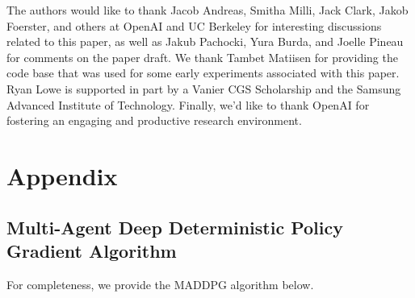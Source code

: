 \documentclass{article}
\begin{document}
The authors would like to thank Jacob Andreas, Smitha Milli, Jack Clark, Jakob Foerster, and others at OpenAI and UC Berkeley for interesting discussions related to this paper, as well as Jakub Pachocki, Yura Burda, and Joelle Pineau for comments on the paper draft. We thank Tambet Matiisen for providing the code base that was used for some early experiments associated with this paper. Ryan Lowe is supported in part by a Vanier CGS Scholarship and the Samsung Advanced Institute of Technology. Finally, we'd like to thank OpenAI for fostering an engaging and productive research environment. 




















\newpage

\section*{Appendix}
\label{sec:appendix}

\subsection*{Multi-Agent Deep Deterministic Policy Gradient Algorithm}
For completeness, we provide the MADDPG algorithm below.
\end{document}
